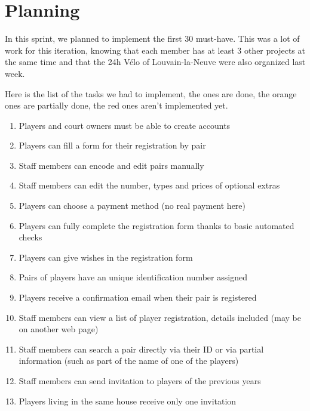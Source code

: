 \section{Planning}

In this sprint, we planned to implement the first 30 must-have. This was a
lot of work for this iteration, knowing that each member has at least 3
other projects at the same time and that the 24h Vélo of Louvain-la-Neuve
were also organized last week. \newline

Here is the list of the tasks we had to implement, the
\color{green!60!black}{green} \color{black}ones are done,
the \color{orange!80!black} orange \color{black} ones are partially done, the
\color{red!80!black}red \color{black} ones aren't implemented yet.

\begin{enumerate}
	\itemsep-0.1em
\color{green!60!black}
    \item Players and court owners must be able to create accounts
    \item Players can fill a form for their registration by pair
    \item Staff members can encode and edit pairs manually
    \item Staff members can edit the number, types and prices of
        optional extras
    \item Players can choose a payment method (no real payment here)
    \item Players can fully complete the registration form thanks to
        basic automated checks
    \item Players can give wishes in the registration form
    \item Pairs of players have an unique identification number assigned
    \item Players receive a confirmation email when their pair is
        registered
    \item Staff members can view a list of player registration, details
        included (may be on another web page)
\color{red!80!black}
    \item Staff members can search a pair directly via their ID or via
        partial information (such as part of the name of one of the
        players)
    \item Staff members can send invitation to players of the previous
        years
    \item Players living in the same house receive only one invitation
\color{green!60!black}

\end{enumerate}
